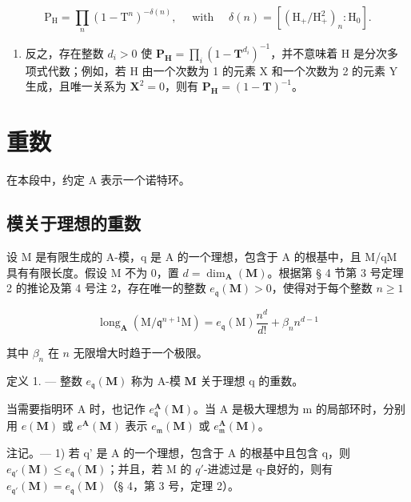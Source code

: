 \[
\mathrm{P} _ {\mathrm{H}} = \prod_ {n} (1 - \mathrm{T} ^ {n}) ^ {- \delta (n)}, \quad \text { with } \quad \delta (n) = \left[ (\mathrm{H} _ {+} / \mathrm{H} _ {+} ^ {2}) _ {n}: \mathrm{H} _ {0} \right].
\]

\begin{enumerate}
\def\labelenumi{\arabic{enumi})}
\setcounter{enumi}{1}
\tightlist
\item
  反之，存在整数 \(d_{i}>0\) 使 \(\mathbf{P}_{\mathbf{H}}=\prod_{i}(1-\mathbf{T}^{d_{i}})^{-1}\)，并不意味着 H 是分次多项式代数；例如，若 H 由一个次数为 1 的元素 X 和一个次数为 2 的元素 Y 生成，且唯一关系为 \(\mathbf{X}^{2}=0\)，则有 \(\mathbf{P}_{\mathbf{H}}=(1-\mathbf{T})^{-1}\)。
\end{enumerate}

\section{重数}

在本段中，约定 A 表示一个诺特环。

\subsection{模关于理想的重数}

设 M 是有限生成的 A-模，q 是 A 的一个理想，包含于 A 的根基中，且 M/qM 具有有限长度。假设 M 不为 0，置 \(d = \dim_{\mathbf{A}}(\mathbf{M})\)。根据第 § 4 节第 3 号定理 2 的推论及第 4 号注 2，存在唯一的整数 \(e_{\mathfrak{q}}(\mathbf{M}) > 0\)，使得对于每个整数 \(n \geqslant 1\)

\[
\operatorname{long} _ {\mathbf {A}} (\mathrm{M} / \mathfrak {q} ^ {n + 1} \mathrm{M}) = e _ {\mathfrak {q}} (\mathrm{M}) \frac {n ^ {d}}{d !} + \beta_ {n} n ^ {d - 1}
\]

其中 \(\beta_{n}\) 在 \(n\) 无限增大时趋于一个极限。

定义 1. --- 整数 \(e_{\mathfrak{q}}(\mathbf{M})\) 称为 A-模 \(\mathbf{M}\) 关于理想 q 的重数。

当需要指明环 A 时，也记作 \(e_{\mathfrak{q}}^{\mathbf{A}}(\mathbf{M})\)。当 A 是极大理想为 m 的局部环时，分别用 \(e(\mathbf{M})\) 或 \(e^{\mathbf{A}}(\mathbf{M})\) 表示 \(e_{\mathfrak{m}}(\mathbf{M})\) 或 \(e_{\mathfrak{m}}^{\mathbf{A}}(\mathbf{M})\)。

注记。--- 1) 若 q' 是 A 的一个理想，包含于 A 的根基中且包含 q，则 \(e_{\mathfrak{q}'}(\mathbf{M}) \leqslant e_{\mathfrak{q}}(\mathbf{M})\)；并且，若 M 的 \(q'\)-进滤过是 q-良好的，则有 \(e_{\mathfrak{q}'}(\mathbf{M}) = e_{\mathfrak{q}}(\mathbf{M})\)（§ 4，第 3 号，定理 2）。

